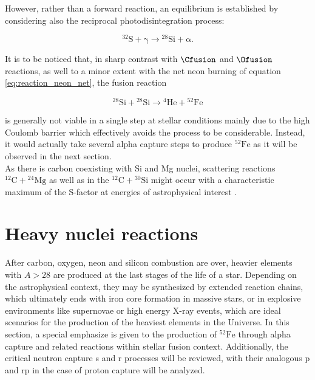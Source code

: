 \documentclass[openany]{book}
\begin{document}
However, rather than a forward reaction, an equilibrium is established by considering also the reciprocal photodisintegration process:

\begin{equation}\label{eq:reaction_S_equillibrium}
	\mathrm{{}^{32}S + \gamma \rightarrow  {}^{28}Si+ \alpha}.
\end{equation}

It is to be noticed that, in sharp contrast with $\Cfusion$ and $\Ofusion$ reactions, as well to a minor extent with the net neon burning of equation \ref{eq:reaction_neon_net}, the fusion reaction

\begin{equation} \label{eq:reaction_28Sifusion_alpha56Fe}
	\mathrm{{}^{28}Si + {}^{28}Si \rightarrow {}^{4}He + {}^{52}Fe }
\end{equation}

is generally not viable in a single step at stellar conditions mainly due to the high Coulomb barrier which effectively avoids the process to be considerable. Instead, it would actually take several alpha capture steps to produce $\mathrm{{}^{52}Fe}$ as it will be observed in the next section. \\

As there is carbon coexisting with Si and Mg nuclei, scattering reactions $\mathrm{{}^{12}C + {}^{24}Mg}$ as well as in the $\mathrm {{}^{12}C + {}^{30}Si}$ might occur with a characteristic maximum of the S-factor at energies of astrophysical interest \cite{montagnoli_stefanini_jiang_colucci_goasduff_brugnara_mazzocco_siciliano_scarlassara_corradi_et_2020}.


\section{Heavy nuclei reactions} \label{sec:heavyReactions}

After carbon, oxygen, neon and silicon combustion are over, heavier elements with $A > 28$ are produced at the last stages of the life of a star. Depending on the astrophysical context, they may be synthesized by extended reaction chains, which ultimately ends with iron core formation in massive stars, or in explosive environments like supernovae or high energy X-ray events, which are ideal scenarios for the production of the  heaviest elements in the Universe. In this section, a special emphasize is given to the production of $\mathrm{{}^{52}Fe}$ through alpha capture and related reactions within stellar fusion context. Additionally, the critical neutron capture s and r processes will be reviewed, with their analogous p and rp in the case of proton capture will be analyzed. 
\end{document}
